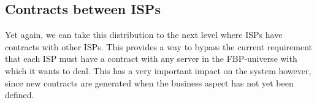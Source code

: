 \subsection{Contracts between ISPs}
Yet again, we can take this distribution to the next level where ISPs have contracts with other ISPs. This provides a way to bypass the current requirement that each ISP must have a contract with any server in the FBP-universe with which it wants to deal. This has a very important impact on the system however, since new contracts are generated when the business aspect has not yet been defined.\\

